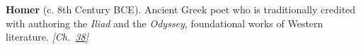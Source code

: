 \textbf{Homer} (c. 8th Century BCE). Ancient Greek poet who is traditionally credited with authoring the \emph{Iliad} and the \emph{Odyssey}, foundational works of Western literature. \emph{[Ch.~\hyperref[ch:christmastruce1914]{38}]}

